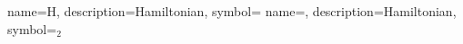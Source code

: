 {name={H}, %
 description={Hamiltonian}, %
 symbol={\hamiltonian} %
}
{name={{\hamiltonian}}, %
 description={Hamiltonian}, %
 symbol={\hamiltonian$_2$} %
}
